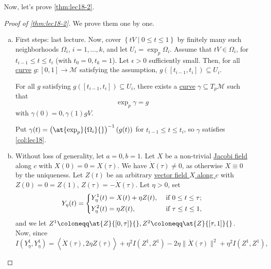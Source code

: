 Now, let's prove \autoref{thm:lec18-2}.
\begin{proof}[Proof of \autoref{thm:lec18-2}]
	We prove them one by one.
	\begin{enumerate}[(a)]
		\item First steps: last lecture. Now, cover \(\left\{ tV \mid 0 \leq t \leq 1 \right\} \) by finitely many such neighborhoods \(\Omega _i\), \(i = 1, \dots , k\), and let \(U_i = \exp _p \Omega _i\). Assume that \(tV\in \Omega _i\), for \(t_{i-1} \leq t \leq t_i\) (with \(t_0 = 0, t_k = 1\)). Let \(\epsilon > 0\) sufficiently small. Then, for all \hyperref[def:curve]{curve} \(g\colon [0, 1] \to \mathcal{M} \) satisfying the assumption, \(g([t_{i-1}, t_i]) \subseteq U_i\).

		      \begin{claim}
			      For all \(g\) satisfying \(g([t_{i-1}, t_i]) \subseteq U_i\), there exists a \hyperref[def:curve]{curve} \(\gamma \subseteq T_p \mathcal{M} \) such that
			      \[
				      \exp _p \gamma = g
			      \]
			      with \(\gamma (0) = 0 , \gamma (1) g V\).
		      \end{claim}
		      \begin{explanation}
			      Put \(\gamma (t) = \left( \at{\exp _p}{\Omega _i}{} \right)^{-1} (g(t)) \) for \(t_{i-1} \leq t \leq t_i\), so \(\gamma \) satisfies \autoref{col:lec18}.
		      \end{explanation}
		\item  Without loss of generality, let \(a = 0, b= 1\). Let \(X\) be a non-trivial \hyperref[def:Jacobi-field]{Jacobi field} along \(c\) with \(X(0) = 0 = X(\tau )\). We have \(\dot{X} (\tau ) \neq 0\), as otherwise \(X \equiv 0\) by the uniqueness. Let \(Z(t)\) be an arbitrary \hyperref[def:vector-field-along-curve]{vector field \(X\) along \(c\)} with \(Z(0) = 0 = Z(1)\), \(Z(\tau ) = - \dot{X} (\tau )\). Let \(\eta > 0\), set
		      \[
			      Y_\eta (t) = \begin{dcases}
				      Y_\eta ^1(t) = X(t) + \eta Z(t), & \text{ if } 0 \leq t \leq \tau ; \\
				      Y_\eta ^2(t) = \eta Z(t),        & \text{ if } \tau \leq t \leq 1 ,
			      \end{dcases}
		      \]
		      and we let \(Z^1 \coloneqq \at{Z}{[0, \tau ]}{} , Z^2 \coloneqq \at{Z}{[\tau , 1]}{} \). Now, since
		      \[
			      I(Y_\eta ^1, Y_\eta ^1)
			      = \left\langle \dot{X} (\tau ), 2 \eta Z(\tau ) \right\rangle + \eta ^2 I(Z^1, Z^1) - 2 \eta \lVert \dot{X}(\tau)\rVert^2 + \eta ^2 I(Z^1, Z^1),
\]
\end{enumerate}
\end{proof}
